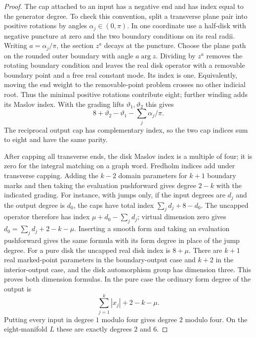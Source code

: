 \begin{proof}
The cap attached to an input has a negative end and has index equal to
the generator degree.  To check this convention, split a transverse
plane pair into positive rotations by angles
$\alpha_j\in(0,\pi)$.  In one coordinate use a half-disk with negative
puncture at zero and the two boundary conditions on its real radii.
Writing $a=\alpha_j/\pi$, the section $z^a$ decays at the puncture.
Choose the plane path on the rounded outer boundary with angle
$a\arg z$.
Dividing by $z^a$ removes the rotating boundary condition and leaves the
real disk operator with a removable boundary point and a free real
constant mode.  Its index is one.  Equivalently, moving the end weight
to the removable-point problem crosses no other indicial root.  Thus
the minimal positive rotations contribute eight; further winding adds
its Maslov index.  With the grading lifts $\vartheta_1,\vartheta_2$ this
gives
\[
 8+\vartheta_2-\vartheta_1-\sum_j\alpha_j/\pi.
\]
The reciprocal output cap has complementary index, so the two cap
indices sum to eight and have the same parity.

After capping all transverse ends, the disk Maslov index is a multiple
of four; it is zero for the integral matching on a graph word.
Fredholm indices add under transverse capping.  Adding the $k-2$
domain parameters for $k+1$ boundary marks and then taking the
evaluation pushforward gives degree $2-k$ with the indicated grading.
For instance, with jumps only, if the input degrees are $d_j$ and
the output degree is $d_0$, the caps have total index
$\sum_jd_j+8-d_0$.  The uncapped operator therefore has index
$\mu+d_0-\sum_jd_j$; virtual dimension zero gives
$d_0=\sum_jd_j+2-k-\mu$.  Inserting a smooth form and taking an
evaluation pushforward gives the same formula with its form degree
in place of the jump degree.
For a pure disk the uncapped real disk index is $8+\mu$.
There are $k+1$ real marked-point parameters in the boundary-output
case and $k+2$ in the interior-output case, and the disk automorphism
group has dimension three.  This proves both dimension formulas.
In the pure case the ordinary form degree of the output is
\[
 \sum_{j=1}^k|x_j|+2-k-\mu.
\]
Putting every input in degree $1$ modulo four gives degree $2$ modulo
four.  On the eight-manifold $L$ these are exactly degrees $2$ and $6$.
\end{proof}

